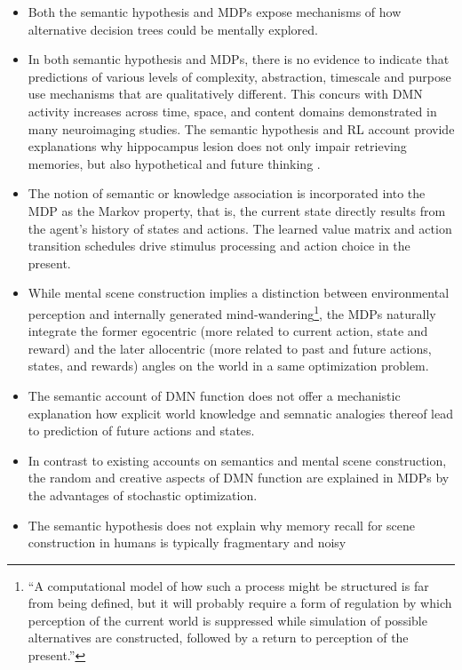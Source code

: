 \documentclass[10pt,letterpaper]{article}
\begin{document}
\begin{itemize}
  \item Both the semantic hypothesis and MDPs expose mechanisms of
  how alternative decision trees could be mentally explored.
  \item In both semantic hypothesis and MDPs,
  there is no evidence to indicate that predictions of various
  levels of complexity, abstraction, timescale and purpose
  use mechanisms that are qualitatively different. This concurs with
  DMN activity increases across time, space, and content domains
  demonstrated in many neuroimaging studies. The semantic hypothesis
  and RL account provide explanations why hippocampus lesion does
  not only impair retrieving memories, but also hypothetical and future
  thinking \citep{hassabis2007patients}.
  \item The notion of semantic or knowledge association is
  incorporated into the MDP as the Markov property,
  that is, the current state directly results from the
  agent's history of states and actions. The learned
  value matrix and action transition schedules drive
  stimulus processing and action choice in the present.
  \item While mental scene construction implies a distinction between
  environmental perception and internally generated mind-wandering\footnote{
  ``A computational model of how such a process might be structured
  is far from being defined, but it will probably require a form of
  regulation by which perception of the current world is suppressed
  while simulation of possible alternatives are constructed,
  followed by a return to perception of the present.''\citep{buckner2007self}},
  the MDPs naturally integrate the former egocentric
  (more related to current action, state and reward) and the later
  allocentric (more related to past and future actions, states, and rewards)
  angles on the world in a same optimization problem.
  \item The semantic account of DMN function does not offer
  a mechanistic explanation how explicit world knowledge and semnatic analogies thereof
  lead to prediction of future actions and states.
  \item In contrast to existing accounts on semantics and
  mental scene construction, the random and creative aspects of DMN function
  are explained in MDPs by the advantages of stochastic optimization.
  \item The semantic hypothesis does not explain why memory recall
  for scene construction in humans is typically fragmentary and noisy

\end{itemize}
\end{document}

